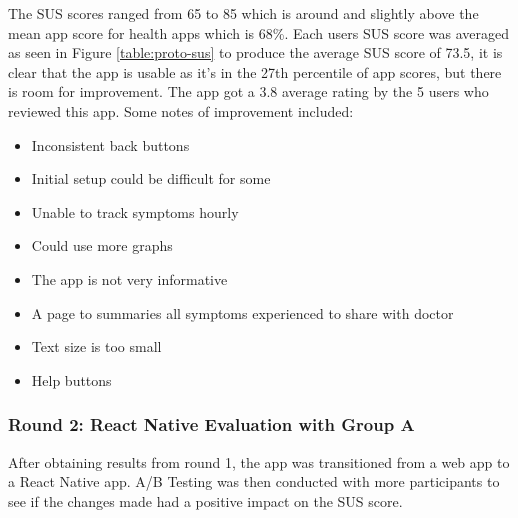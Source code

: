 The SUS scores ranged from 65 to 85 which is around and slightly above the mean app score for health apps which is 68\%\cite{Hyzy2022}. Each users SUS score was averaged as seen in Figure \ref{table:proto-sus} to produce the average SUS score of 73.5, it is clear that the app is usable as it's in the 27th percentile of app scores, but there is room for improvement. The app got a 3.8 average rating by the 5 users who reviewed this app. Some notes of improvement included:

\begin{itemize}
    \item Inconsistent back buttons
    \item Initial setup could be difficult for some 
    \item Unable to track symptoms hourly
    \item Could use more graphs
    \item The app is not very informative
    \item A page to summaries all symptoms experienced to share with doctor
    \item Text size is too small
    \item Help buttons
\end{itemize}


\subsubsection{Round 2: React Native Evaluation with Group A}
After obtaining results from round 1, the app was transitioned from a web app to a React Native app. A/B Testing was then conducted with more participants to see if the changes made had a positive impact on the SUS score. 

